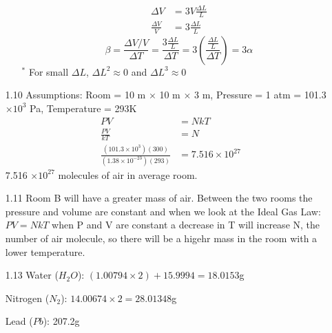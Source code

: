 \documentclass{article}
\begin{document}
\begin{enumerate}
\begin{enumerate}
\begin{align*}
                \Delta V &= 3V \frac{\Delta L}{L} \\
                \frac{\Delta V}{V} &= 3 \frac{\Delta L}{L}
            \end{align*}
            \begin{equation*}
                \beta = \frac{\Delta V / V}{\Delta T} = \frac{3 \frac{\Delta L}{L}}{\Delta T} = 3 \left(\frac{\frac{\Delta L}{L}}{\Delta T} \right) = 3 \alpha
            \end{equation*}
            \(^{\ast}\) For small \(\Delta L\), \(\Delta L^2 \approx 0\) and \(\Delta L^3 \approx 0\)
    \end{enumerate}
    \vspace{0.1in}
    \item [1.10]
    Assumptions: Room = 10 m \(\times\) 10 m \(\times\) 3 m, Pressure = 1 atm = 101.3 \(\times 10^3\) Pa, Temperature = 293\degree K
       \begin{align*}
            PV &= NkT \\
            \frac{PV}{kT} &= N \\
            \frac{(101.3 \times 10^3)(300)}{(1.38 \times 10^{-23})(293)} &= 7.516 \times 10^{27}
        \end{align*}
        7.516 \(\times 10^{27}\) molecules of air in average room.
    \vspace{0.1in}
    \item [1.11]
    Room B will have a greater mass of air. Between the two rooms the pressure and volume are constant and when we look at the Ideal Gas Law: \(PV = NkT\) when P and V are constant a decrease in T will increase N, the number of air molecule, so there will be a higehr mass in the room with a lower temperature.
    \vspace{0.1in}
    \item [1.13]
    Water (\(H_2 O\)): \((1.00794 \times 2) + 15.9994 = 18.0153\)g

    Nitrogen (\(N_2\)): \(14.00674 \times 2 = 28.01348\)g

    Lead (\(Pb\)): 207.2g


\end{enumerate}
\end{document}
